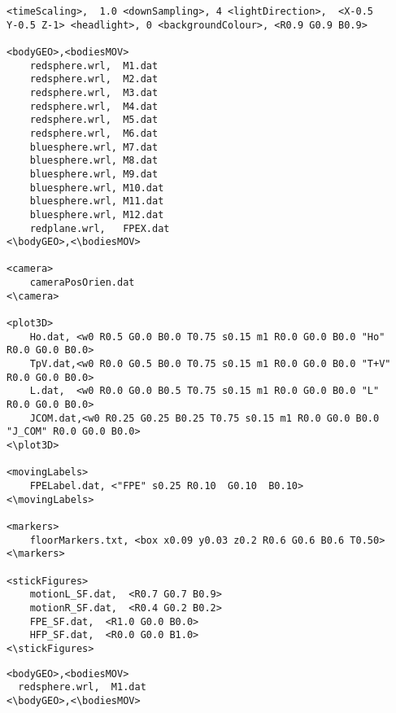 \begin{verbatim}
<timeScaling>,  1.0 <downSampling>, 4 <lightDirection>,  <X-0.5
Y-0.5 Z-1> <headlight>, 0 <backgroundColour>, <R0.9 G0.9 B0.9>

<bodyGEO>,<bodiesMOV>
    redsphere.wrl,  M1.dat
    redsphere.wrl,  M2.dat
    redsphere.wrl,  M3.dat
    redsphere.wrl,  M4.dat
    redsphere.wrl,  M5.dat
    redsphere.wrl,  M6.dat
    bluesphere.wrl, M7.dat
    bluesphere.wrl, M8.dat
    bluesphere.wrl, M9.dat
    bluesphere.wrl, M10.dat
    bluesphere.wrl, M11.dat
    bluesphere.wrl, M12.dat
    redplane.wrl,   FPEX.dat
<\bodyGEO>,<\bodiesMOV>

<camera>
    cameraPosOrien.dat
<\camera>

<plot3D>
    Ho.dat, <w0 R0.5 G0.0 B0.0 T0.75 s0.15 m1 R0.0 G0.0 B0.0 "Ho"  R0.0 G0.0 B0.0>
    TpV.dat,<w0 R0.0 G0.5 B0.0 T0.75 s0.15 m1 R0.0 G0.0 B0.0 "T+V" R0.0 G0.0 B0.0>
    L.dat,  <w0 R0.0 G0.0 B0.5 T0.75 s0.15 m1 R0.0 G0.0 B0.0 "L"   R0.0 G0.0 B0.0>
    JCOM.dat,<w0 R0.25 G0.25 B0.25 T0.75 s0.15 m1 R0.0 G0.0 B0.0 "J_COM" R0.0 G0.0 B0.0>
<\plot3D>

<movingLabels>
    FPELabel.dat, <"FPE" s0.25 R0.10  G0.10  B0.10>
<\movingLabels>

<markers>
    floorMarkers.txt, <box x0.09 y0.03 z0.2 R0.6 G0.6 B0.6 T0.50>
<\markers>

<stickFigures>
    motionL_SF.dat,  <R0.7 G0.7 B0.9>
    motionR_SF.dat,  <R0.4 G0.2 B0.2>
    FPE_SF.dat,  <R1.0 G0.0 B0.0>
    HFP_SF.dat,  <R0.0 G0.0 B1.0>
<\stickFigures>
\end{verbatim}

\begin{verbatim}
<bodyGEO>,<bodiesMOV>
  redsphere.wrl,  M1.dat
<\bodyGEO>,<\bodiesMOV>
\end{verbatim}
